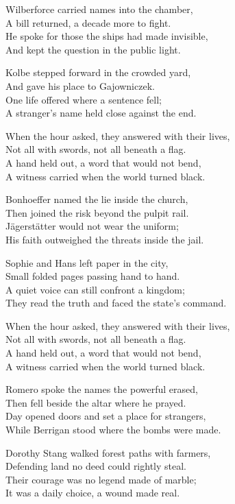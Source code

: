 \begin{lyrics}
Wilberforce carried names into the chamber,\\
A bill returned, a decade more to fight.\\
He spoke for those the ships had made invisible,\\
And kept the question in the public light.

Kolbe stepped forward in the crowded yard,\\
And gave his place to Gajowniczek.\\
One life offered where a sentence fell;\\
A stranger’s name held close against the end.

When the hour asked, they answered with their lives,\\
Not all with swords, not all beneath a flag.\\
A hand held out, a word that would not bend,\\
A witness carried when the world turned black.

Bonhoeffer named the lie inside the church,\\
Then joined the risk beyond the pulpit rail.\\
Jägerstätter would not wear the uniform;\\
His faith outweighed the threats inside the jail.

Sophie and Hans left paper in the city,\\
Small folded pages passing hand to hand.\\
A quiet voice can still confront a kingdom;\\
They read the truth and faced the state’s command.

When the hour asked, they answered with their lives,\\
Not all with swords, not all beneath a flag.\\
A hand held out, a word that would not bend,\\
A witness carried when the world turned black.

Romero spoke the names the powerful erased,\\
Then fell beside the altar where he prayed.\\
Day opened doors and set a place for strangers,\\
While Berrigan stood where the bombs were made.

Dorothy Stang walked forest paths with farmers,\\
Defending land no deed could rightly steal.\\
Their courage was no legend made of marble;\\
It was a daily choice, a wound made real.


\end{lyrics}
